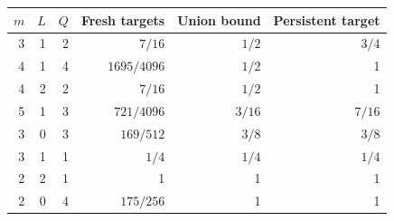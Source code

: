 \begin{tabular}{rrrrrr}
\toprule
$m$ & $L$ & $Q$ & Fresh targets & Union bound & Persistent target \\
\midrule
3 & 1 & 2 & $7/16$ & $1/2$ & $3/4$ \\
4 & 1 & 4 & $1695/4096$ & $1/2$ & 1 \\
4 & 2 & 2 & $7/16$ & $1/2$ & 1 \\
5 & 1 & 3 & $721/4096$ & $3/16$ & $7/16$ \\
3 & 0 & 3 & $169/512$ & $3/8$ & $3/8$ \\
3 & 1 & 1 & $1/4$ & $1/4$ & $1/4$ \\
2 & 2 & 1 & 1 & 1 & 1 \\
2 & 0 & 4 & $175/256$ & 1 & 1 \\
\bottomrule
\end{tabular}
